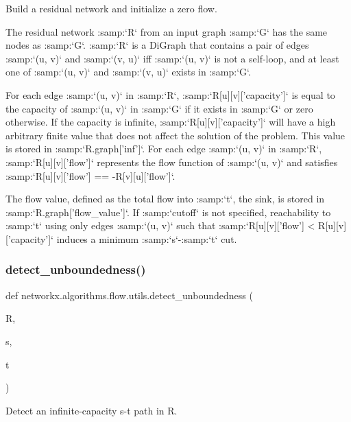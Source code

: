 \begin{DoxyVerb}Build a residual network and initialize a zero flow.

The residual network :samp:`R` from an input graph :samp:`G` has the
same nodes as :samp:`G`. :samp:`R` is a DiGraph that contains a pair
of edges :samp:`(u, v)` and :samp:`(v, u)` iff :samp:`(u, v)` is not a
self-loop, and at least one of :samp:`(u, v)` and :samp:`(v, u)` exists
in :samp:`G`.

For each edge :samp:`(u, v)` in :samp:`R`, :samp:`R[u][v]['capacity']`
is equal to the capacity of :samp:`(u, v)` in :samp:`G` if it exists
in :samp:`G` or zero otherwise. If the capacity is infinite,
:samp:`R[u][v]['capacity']` will have a high arbitrary finite value
that does not affect the solution of the problem. This value is stored in
:samp:`R.graph['inf']`. For each edge :samp:`(u, v)` in :samp:`R`,
:samp:`R[u][v]['flow']` represents the flow function of :samp:`(u, v)` and
satisfies :samp:`R[u][v]['flow'] == -R[v][u]['flow']`.

The flow value, defined as the total flow into :samp:`t`, the sink, is
stored in :samp:`R.graph['flow_value']`. If :samp:`cutoff` is not
specified, reachability to :samp:`t` using only edges :samp:`(u, v)` such
that :samp:`R[u][v]['flow'] < R[u][v]['capacity']` induces a minimum
:samp:`s`-:samp:`t` cut.\end{DoxyVerb}
 \mbox{\label{namespacenetworkx_1_1algorithms_1_1flow_1_1utils_a1bb8d6c8638ad8f624b26b1bcefc42ed}} 
\subsubsection{\texorpdfstring{detect\+\_\+unboundedness()}{detect\_unboundedness()}}
{\footnotesize\ttfamily def networkx.\+algorithms.\+flow.\+utils.\+detect\+\_\+unboundedness (\begin{DoxyParamCaption}\item[{}]{R,  }\item[{}]{s,  }\item[{}]{t }\end{DoxyParamCaption})}

\begin{DoxyVerb}Detect an infinite-capacity s-t path in R.\end{DoxyVerb}
 